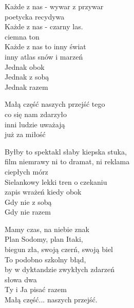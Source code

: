 \begin{text}
    Każde z nas - wywar z przywar\\
    poetycka recydywa\\
    Każde z nas - czarny las.\\
    ciemna ton\\
    Każde z nas to inny świat\\
    inny atlas snów i marzeń\\
    Jednak obok\\
    Jednak z sobą\\
    Jednak razem

    Małą część naszych przejść tego\\
    co się nam zdarzyło\\
    inni ludzie uważają\\
    już za miłość

    Byłby to spektakl słaby kiepska stuka,\\
    film niemrawy ni to dramat, ni reklama\\
    ciepłych mórz\\
    Sielankowy lekki tren o czekaniu\\
    zapis wrażeń kiedy obok\\
    Gdy nie z sobą\\
    Gdy nie razem

    Mamy czas, na niebie znak\\
    Plan Sodomy, plan Itaki,\\
    biegun zła, swoją czerń, swoją biel\\
    To podobno szkolny błąd,\\
    by w dyktandzie zwykłych zdarzeń\\
    słowa dwa\\
    Ty i Ja pisać razem\\
    Małą część... naszych przejść.
\end{text}
